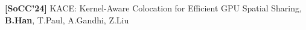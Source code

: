 \begin{zitemize}
    \item \textbf{[SoCC'24]} KACE: Kernel-Aware Colocation for Efficient GPU Spatial Sharing, \textbf{B.Han}, T.Paul, A.Gandhi, Z.Liu 
\end{zitemize}